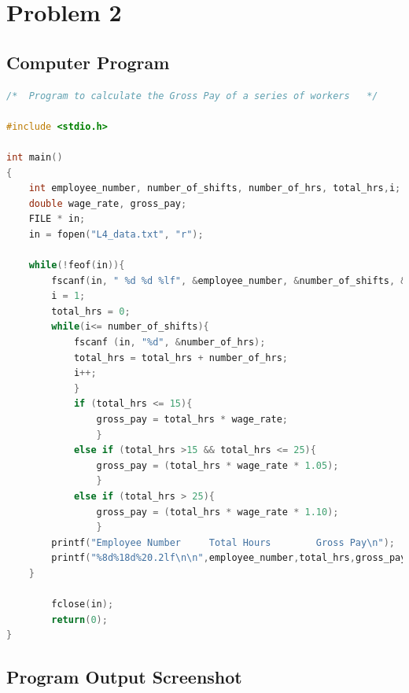 \section{{Problem 2}}
	
		\subsection{{Computer Program}}
	
			\begin{lstlisting}[language=C, caption=\textit{Program to calculate the Gross Pay of a series of workers}]	
/*  Program to calculate the Gross Pay of a series of workers   */

#include <stdio.h>

int main()
{
    int employee_number, number_of_shifts, number_of_hrs, total_hrs,i;
    double wage_rate, gross_pay;
    FILE * in;
    in = fopen("L4_data.txt", "r");

    while(!feof(in)){
        fscanf(in, " %d %d %lf", &employee_number, &number_of_shifts, &wage_rate);
        i = 1;
        total_hrs = 0;
        while(i<= number_of_shifts){
            fscanf (in, "%d", &number_of_hrs);
            total_hrs = total_hrs + number_of_hrs;
            i++;
            }
            if (total_hrs <= 15){
                gross_pay = total_hrs * wage_rate;
                }
            else if (total_hrs >15 && total_hrs <= 25){
                gross_pay = (total_hrs * wage_rate * 1.05);
                }
            else if (total_hrs > 25){
                gross_pay = (total_hrs * wage_rate * 1.10);
                }
        printf("Employee Number     Total Hours        Gross Pay\n");
        printf("%8d%18d%20.2lf\n\n",employee_number,total_hrs,gross_pay);
    }
    
        fclose(in);
        return(0);
}

	\end{lstlisting}

		\subsection{{Program Output Screenshot}}
			
			{}
			
